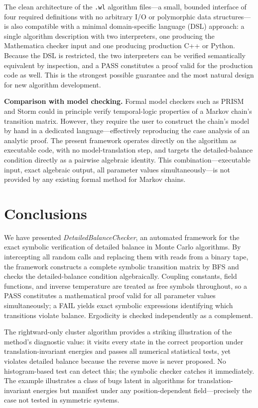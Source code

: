 \documentclass[twocolumn,10pt]{article}
\newcommand{\DBC}{\textit{DetailedBalanceChecker}}
\begin{document}
The clean architecture of the \texttt{.wl} algorithm files---a small,
bounded interface of four required definitions with no arbitrary I/O or
polymorphic data structures---is also compatible with a minimal domain-specific
language (DSL) approach: a single algorithm description with two
interpreters, one producing the Mathematica checker input and one producing
production C++ or Python.  Because the DSL is restricted, the two
interpreters can be verified semantically equivalent by inspection, and a
PASS constitutes a proof valid for the production code as well.  This is the
strongest possible guarantee and the most natural design for new algorithm
development.

\medskip\noindent\textbf{Comparison with model checking.}
Formal model checkers such as PRISM and Storm could in principle verify
temporal-logic properties of a Markov chain's transition matrix.  However,
they require the user to construct the chain's model by hand in a dedicated
language---effectively reproducing the case analysis of an analytic proof.
The present framework operates directly on the algorithm as executable code,
with no model-translation step, and targets the detailed-balance condition
directly as a pairwise algebraic identity.  This combination---executable
input, exact algebraic output, all parameter values simultaneously---is not
provided by any existing formal method for Markov chains.

\section{Conclusions}
\label{sec:conclusion}

We have presented \DBC{}, an automated framework for the exact symbolic
verification of detailed balance in Monte Carlo algorithms.  By intercepting
all random calls and replacing them with reads from a binary tape, the
framework constructs a complete symbolic transition matrix by BFS and checks
the detailed-balance condition algebraically.  Coupling constants, field
functions, and inverse temperature are treated as free symbols throughout,
so a PASS constitutes a mathematical proof valid for all parameter values
simultaneously; a FAIL yields exact symbolic expressions identifying which
transitions violate balance.  Ergodicity is checked independently as a
complement.

The rightward-only cluster algorithm provides a striking illustration of the
method's diagnostic value: it visits every state in the correct proportion
under translation-invariant energies and passes all numerical statistical
tests, yet violates detailed balance because the reverse move is never
proposed.  No histogram-based test can detect this; the symbolic checker
catches it immediately.  The example illustrates a class of bugs latent in
algorithms for translation-invariant energies but manifest under any
position-dependent field---precisely the case not tested in symmetric systems.
\end{document}
